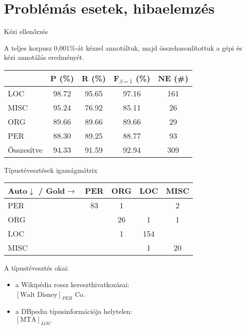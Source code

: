 \documentclass[utf8x,t]{beamer}
\begin{document}
\section{Problémás esetek, hibaelemzés}

\begin{frame}{Kézi ellenőrzés}

\bigskip

A teljes korpusz 0,001\%-át kézzel annotáltuk, majd összehasonlítottuk a gépi és kézi annotálás eredményét.

\bigskip

\begin{center}
\begin{tabular}{lcccc}
\toprule
& P (\%) &  R (\%) & F$_{\beta=1}$ (\%) & NE (\#) \\
\midrule
LOC     &   98.72 &  95.65 &  97.16 & 161 \\
MISC    &   95.24 &  76.92 &  85.11 & 26 \\
ORG     &   89.66 &  89.66 &  89.66 & 29 \\
PER     &   88.30 &  89.25 &  88.77 & 93 \\
\midrule
Összesítve &   94.33 &  91.59 &  92.94 & 309 \\
\bottomrule
\end{tabular} 
\end{center}

\end{frame}

\begin{frame}{Típustévesztések igazságmátrix}

\bigskip

\begin{center}
\begin{tabular}{l@{\hspace{0.5em}}|@{\hspace{0.5em}}cccc}
\toprule
Auto$\downarrow$ / Gold$\rightarrow$ & PER & ORG & LOC & MISC \\
\midrule
PER & 83 & 1 & & 2 \\
ORG &  & 26 & 1 & 1 \\
LOC &  & 1 & 154 & \\
MISC &  &  & 1 & 20 \\
\bottomrule
\end{tabular}
\end{center}

\bigskip

A típustévesztés okai:

\begin{itemize}
\item a Wikipédia rossz kereszthivatkozásai: \\ $[\mbox{Walt Disney}]_{PER}$ Co.
\item a DBpedia típusinformációja helytelen: \\ $[\mbox{MTA}]_{LOC}$
\end{itemize}

\end{frame}
\end{document}
